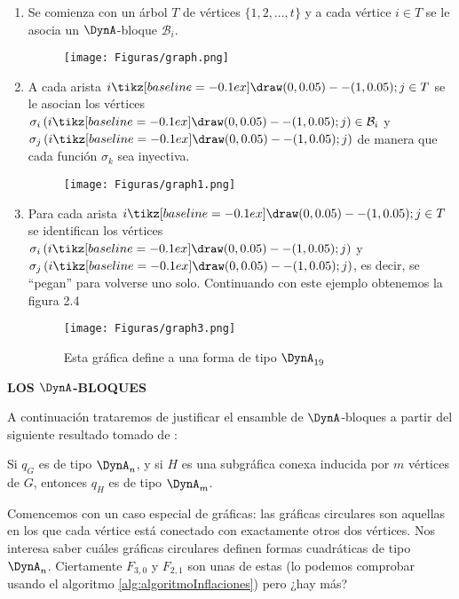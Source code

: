 \begin{enumerate}
\item Se comienza con un árbol $T$ de vértices $\{1, 2, \ldots, t\}$ y a cada vértice $i \in T$ se le asocia un $\DynA$-bloque $\mathcal{B}_{i}$.
 \begin{figure}[H]
    \centering%
    \texttt{[image: Figuras/graph.png]}
\end{figure}
\item A cada arista $i \tikz[baseline=-0.1ex]\draw (0,0.05) -- (1,0.05); j \in T$ se le asocian los vértices $\sigma_{i}\left(i \tikz[baseline=-0.1ex]\draw (0,0.05) -- (1,0.05); j\right) \in \mathcal{B}_{i}$ y $\sigma_{j}\left(i \tikz[baseline=-0.1ex]\draw (0,0.05) -- (1,0.05); j \right)$ de manera que cada función $\sigma_{k}$ sea inyectiva.
 \begin{figure}[H]
    \centering%
    \texttt{[image: Figuras/graph1.png]}
\end{figure}
\item Para cada arista $i \tikz[baseline=-0.1ex]\draw (0,0.05) -- (1,0.05); j \in T$ se identifican los vértices $\sigma_{i}\left(i \tikz[baseline=-0.1ex]\draw (0,0.05) -- (1,0.05); j\right)$ y $\sigma_{j}\left(i \tikz[baseline=-0.1ex]\draw (0,0.05) -- (1,0.05); j\right)$, es decir, se “pegan” para volverse uno solo. Continuando con este ejemplo obtenemos la figura 2.4
 \begin{figure}[H]
    \centering%
    \texttt{[image: Figuras/graph3.png]}
     \caption{Esta gráfica define a una forma de tipo $\DynA_{19}$}
    \label{figura:2.4}
\end{figure}
\end{enumerate}

\textbf{LOS $\DynA$-BLOQUES}

A continuación trataremos de justificar el ensamble de $\DynA$-bloques a partir del siguiente resultado tomado de \citep{article123}:
\begin{theorem}
Si $q_{G}$ es de tipo $\DynA_{n}$, y si $H$ es una subgráfica conexa inducida por $m$ vértices de $G$, entonces $q_{H}$ es de tipo $\DynA_{m}$.
\label{teorema:2.5}
\end{theorem}
Comencemos con un caso especial de gráficas: las gráficas circulares son aquellas en los que cada vértice está conectado con exactamente otros dos vértices. Nos interesa saber cuáles gráficas circulares definen formas cuadráticas de tipo $\DynA_{n}$. Ciertamente $F_{3,0}$ y $F_{2,1}$ son unas de estas (lo podemos comprobar usando el algoritmo \ref{alg:algoritmoInflaciones}) pero ¿hay más?\\

